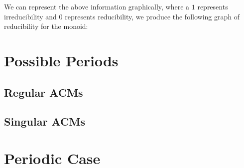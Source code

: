\documentclass[12pt,reqno]{amsart}
\theoremstyle{definition}
\begin{document}
\newpage
\noindent{}We can represent the above information graphically, where a $1$ represents irreducibility and $0$ represents reducibility, we produce the following graph of reducibility for the monoid:


\newpage
\section{Possible Periods}%
\label{s:Periodicity}%


\subsection{Regular ACMs}


\subsection{Singular ACMs}


\section{Periodic Case}%
\label{s:Periodicity}%


\end{document}

